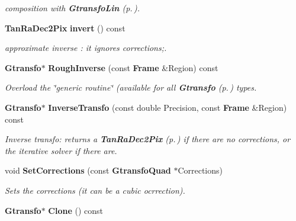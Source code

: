 \begin{CompactItemize}
\begin{CompactList}\small\item\em composition with {\bf Gtransfo\-Lin} {\rm (p.\,\pageref{class_gtransfolin})}.\item\end{CompactList}\item 
{}
{\bf Tan\-Ra\-Dec2Pix} {\bf invert} () const\label{class_tanpix2radec_a7}

\begin{CompactList}\small\item\em approximate inverse : it ignores corrections;.\item\end{CompactList}\item 
{}
{\bf Gtransfo}$\ast$ {\bf Rough\-Inverse} (const {\bf Frame} \&Region) const\label{class_tanpix2radec_a8}

\begin{CompactList}\small\item\em Overload the \char`\"{}generic routine\char`\"{} (available for all {\bf Gtransfo} {\rm (p.\,\pageref{class_gtransfo})} types.\item\end{CompactList}\item 
{}
{\bf Gtransfo}$\ast$ {\bf Inverse\-Transfo} (const double Precision, const {\bf Frame} \&Region) const\label{class_tanpix2radec_a9}

\begin{CompactList}\small\item\em Inverse transfo: returns a {\bf Tan\-Ra\-Dec2Pix} {\rm (p.\,\pageref{class_tanradec2pix})} if there are no corrections, or the iterative solver if there are.\item\end{CompactList}\item 
{}
void {\bf Set\-Corrections} (const {\bf Gtransfo\-Quad} $\ast$Corrections)\label{class_tanpix2radec_a10}

\begin{CompactList}\small\item\em Sets the corrections (it can be a cubic ocrrection).\item\end{CompactList}\item 
{}
{\bf Gtransfo}$\ast$ {\bf Clone} () const\label{class_tanpix2radec_a11}


\end{CompactItemize}
